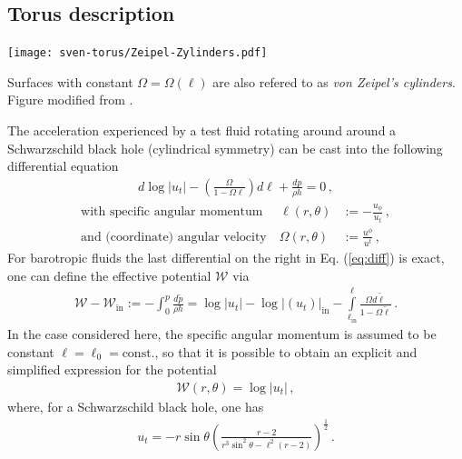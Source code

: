 \subsection*{Torus description}
\label{sec:TorusIC}
\begin{marginfigure}
	\texttt{[image: sven-torus/Zeipel-Zylinders.pdf]}
	\caption[
	   Zeipel's cylinders, 
	]{Surfaces with constant $\Omega=\Omega(\ell)$ are also refered to
	  as \emph{von Zeipel's cylinders}. Figure modified from \cite{Font02a}.
}
\end{marginfigure}
The acceleration experienced by a test fluid rotating around around a
Schwarz\-schild black hole (cylindrical symmetry) can be cast into the
following differential equation
%
\begin{align}
\label{eq:diff}
d \log |u_t| - \left(\frac{\Omega}{1-\Omega \ell} \right) d \ell +
\frac{d p}{\rho h} = 0\,, 
\end{align}
\begin{align}
\label{eq:Omega}
\text{with specific angular momentum }\quad
\ell(r,\theta)&:=-\frac{u_\phi}{u_t} \,, \\
\text{and (coordinate) angular velocity} \quad \Omega(r,\theta)&:=
\frac{u^\phi}{u^t} \,,
\end{align}
%
For {barotropic} fluids the last differential
on the right in Eq. (\ref{eq:diff}) is exact, \ie one can define the
{effective potential} $\mathcal{W}$ via
%
\begin{align}
\mathcal{W}-\mathcal{W}_{\text{in}} := - \int_0^p \frac{d \tilde{p}}{\rho
	h}=
\log |u_t| -
\log|(u_t)|_{\text{in}} - \int \limits_{\ell_{\text{in}}}^{\ell}
\frac{\Omega d\tilde{\ell}}{1-\Omega \tilde{\ell}}\,.
\end{align}
%
%
In the case considered here, the specific angular momentum is assumed
to be constant $\ell=\ell_0=\text{const.}$, so that it is possible to obtain
an explicit and simplified expression for the potential
%
\begin{align}
\mathcal{W}(r,\theta) = \log |u_t|\,,
\label{eq:effPot}
\end{align}
%
where, for a Schwarzschild black hole, one has
%
\begin{align}
u_t = -r \sin \theta \left( \frac{r-2}{r^3 \sin^2 \theta - \ell^2
	(r-2)}\right)^{\frac{1}{2}}\,.
\end{align}

